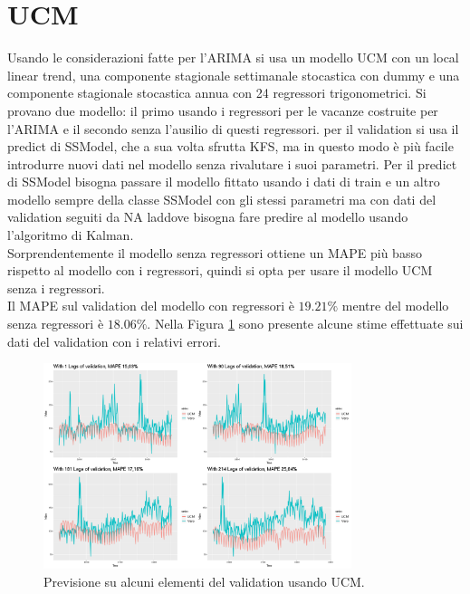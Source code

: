 \documentclass[12pt, onecolumn]{article}
\begin{document}
\section*{UCM}
Usando le considerazioni fatte per l'ARIMA si usa un modello UCM con un local linear trend, una componente stagionale settimanale stocastica con dummy e una componente stagionale stocastica annua con 24 regressori trigonometrici.
Si provano due modello: il primo usando i regressori per le vacanze costruite per l'ARIMA e il secondo senza l'ausilio di questi regressori.
per il validation si usa il predict di SSModel, che a sua volta sfrutta KFS, ma in questo modo è più facile introdurre nuovi dati nel modello senza rivalutare i suoi parametri.
Per il predict di SSModel bisogna passare il modello fittato usando i dati di train e un altro modello sempre della classe SSModel con gli stessi parametri ma con dati del validation seguiti da NA laddove bisogna fare predire al modello usando l'algoritmo di Kalman.\\
Sorprendentemente il modello senza regressori ottiene un MAPE più basso rispetto al modello con i regressori, quindi si opta per usare il modello UCM senza i regressori.\\
Il MAPE sul validation del modello con regressori è $19.21\%$ mentre del modello senza regressori è $18.06\%$. Nella Figura \ref{fig:UCM_pred} sono presente alcune stime effettuate sui dati del validation con i relativi errori.
\begin{figure}[!h]
  \centering
  \includegraphics[width=\linewidth,height=6cm]{imgs/forecast_ucm.png}
  \caption{Previsione su alcuni elementi del validation usando UCM.}
  \label{fig:UCM_pred}
\end{figure}\\
\end{document}
